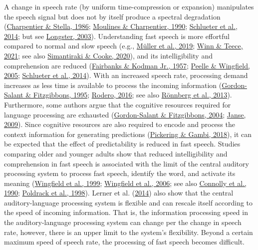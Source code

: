 \documentclass[a4paper, nobind]{templates/ociamthesis}
\begin{document}
A change in speech rate (by uniform time-compression or expansion) manipulates the speech signal but does not by itself produce a spectral degradation (\protect\hyperlink{ref-Charpentier1986}{Charpentier \& Stella, 1986}; \protect\hyperlink{ref-Moulines1990}{Moulines \& Charpentier, 1990}; \protect\hyperlink{ref-Schlueter2014}{Schlueter et al., 2014}; but see \protect\hyperlink{ref-Longster2003}{Longster, 2003}).
Understanding fast speech is more effortful compared to normal and slow speech (e.g., \protect\hyperlink{ref-Mueller2019}{Müller et al., 2019}; \protect\hyperlink{ref-Winn2021}{Winn \& Teece, 2021}; see also \protect\hyperlink{ref-Simantiraki2020}{Simantiraki \& Cooke, 2020}),
and its intelligibility and comprehension are reduced (\protect\hyperlink{ref-Fairbanks1957}{Fairbanks \& Kodman Jr., 1957}; \protect\hyperlink{ref-Peelle2005}{Peelle \& Wingfield, 2005}; \protect\hyperlink{ref-Schlueter2014}{Schlueter et al., 2014}).
With an increased speech rate, processing demand increases as less time is available to process the incoming information (\protect\hyperlink{ref-Gordonsalant1995}{Gordon-Salant \& Fitzgibbons, 1995}; \protect\hyperlink{ref-Rodero2016}{Rodero, 2016}; see also \protect\hyperlink{ref-Roennberg2013}{Rönnberg et al., 2013}).
Furthermore, some authors argue that the cognitive resources required for language processing are exhausted (\protect\hyperlink{ref-Gordonsalant2004}{Gordon-Salant \& Fitzgibbons, 2004}; \protect\hyperlink{ref-Janse2009}{Janse, 2009}).
Since cognitive resources are also required to encode and process the context information for generating predictions (\protect\hyperlink{ref-Pickering2018}{Pickering \& Gambi, 2018}), it can be expected that the effect of predictability is reduced in fast speech.
Studies comparing older and younger adults show that reduced intelligibility and comprehension in fast speech is associated with the limit of the central auditory processing system to process fast speech, identify the word, and activate its meaning (\protect\hyperlink{ref-Wingfield1999}{Wingfield et al., 1999}; \protect\hyperlink{ref-Wingfield2006}{Wingfield et al., 2006}; see also \protect\hyperlink{ref-Connolly1990}{Connolly et al., 1990}; \protect\hyperlink{ref-Poldrack1998}{Poldrack et al., 1998}).
Lerner et al. (\protect\hyperlink{ref-Lerner2014}{2014}) also show that the central auditory-language processing system is flexible and can rescale itself according to the speed of incoming information.
That is, the information processing speed in the auditory-language processing system can change per the change in speech rate,
however, there is an upper limit to the system's flexibility.
Beyond a certain maximum speed of speech rate, the processing of fast speech becomes difficult.
\end{document}
